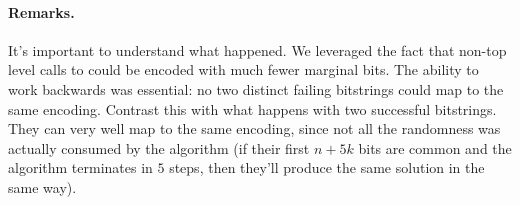 \documentclass[12pt]{article}
\begin{document}
\paragraph{Remarks.}

It's important to understand what happened. We leveraged the fact that non-top
level calls to \Fix could be encoded with much fewer marginal bits. The ability
to work backwards was essential: no two distinct failing bitstrings could map to
the same encoding. Contrast this with what happens with two successful
bitstrings. They can very well map to the same encoding, since not all the
randomness was actually consumed by the algorithm (if their first $n + 5k$ bits
are common and the algorithm terminates in $5$ steps, then they'll produce the
same solution in the same way).

\printbibliography
\end{document}
